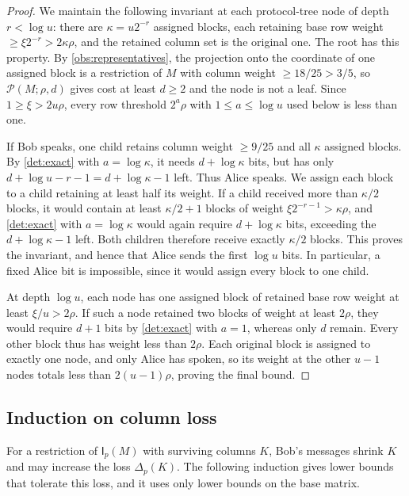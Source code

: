 \documentclass[11pt,letterpaper]{article} \usepackage[utf8]{inputenc}
\theoremstyle{plain} \newtheorem{theorem}{Theorem}[section]
\theoremstyle{definition} \newaliascnt{definition}{theorem}
\newcommand{\Int}[2]{\mathsf{I}_{#1}(#2)}
\newcommand{\RP}[3]{\mathcal{P}(#1;#2,#3)}
\begin{document}
\begin{proof}
We maintain the following invariant at each protocol-tree node of depth
$r<\log u$: there are $\kappa=u2^{-r}$ assigned blocks, each retaining base row
weight $\ge\xi2^{-r}>2\kappa\rho$, and the retained column set is the original
one. The root has this property. By
\cref{obs:representatives}, the projection onto the coordinate of one assigned
block is a restriction of $M$ with column weight $\ge18/25>3/5$, so $\RP{M}{\rho}{d}$ gives cost at least $d\ge2$ and the
node is not a leaf. Since $1\ge\xi>2u\rho$, every row threshold $2^a\rho$ with
$1\le a\le\log u$ used below is less than one.

If Bob speaks, one child retains column weight $\ge9/25$ and all
$\kappa$ assigned blocks. By \cref{det:exact} with $a=\log\kappa$,
it needs $d+\log\kappa$ bits, but has only
$d+\log u-r-1=d+\log\kappa-1$ left. Thus Alice speaks. We assign each block
to a child retaining at least half its weight. If a child received more than
$\kappa/2$ blocks, it would contain at least $\kappa/2+1$ blocks of weight
$\xi2^{-r-1}>\kappa\rho$, and \cref{det:exact} with $a=\log\kappa$ would again
require $d+\log\kappa$ bits, exceeding the $d+\log\kappa-1$ left.
Both children therefore receive exactly $\kappa/2$ blocks. This proves the
invariant, and hence that Alice sends the first $\log u$ bits. In particular, a fixed Alice
bit is impossible, since it would assign every block to one child.

At depth $\log u$, each node has one assigned block of retained base row weight at least
$\xi/u>2\rho$. If such a node retained two blocks of weight at least $2\rho$, they
would require $d+1$ bits by
\cref{det:exact} with $a=1$, whereas only $d$ remain. Every other block thus has
weight less than $2\rho$. Each original block is assigned to exactly one node, and only Alice has spoken,
so its weight at the other $u-1$ nodes totals less than $2(u-1)\rho$, proving the final bound.
\end{proof}

\subsection{Induction on column loss}
\label{sec:interlace-induction}

For a restriction of $\Int{p}{M}$ with surviving columns $K$, Bob's messages
shrink $K$ and may increase the loss $\Delta_p(K)$. The following induction gives lower bounds
that tolerate this loss, and it uses only lower bounds on the base matrix.
\end{document}
